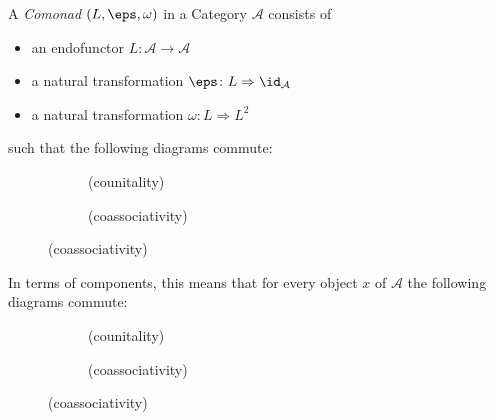 \begin{definition}[Comonad]
A \textit{Comonad} $(L,\eps, \omega) $ in a Category $\mathcal{A}$ consists of
\begin{itemize}
    \item an endofunctor $L\colon \mathcal{A} \to \mathcal{A}$
    \item a natural transformation $\eps \colon L \Rightarrow \id_{\mathcal{A}}$ 
    \item a natural transformation $\omega\colon L \Rightarrow L^2 $
\end{itemize}  
such that the following diagrams commute:

\begin{figure}[H]
\centering
\begin{subfigure}{0.4\textwidth}
\centering
\caption*{(counitality)}
\end{subfigure}
\hspace{2em}
\begin{subfigure}{0.4\textwidth}
\centering
\caption*{(coassociativity)}
\end{subfigure}
\end{figure}


In terms of components, this means that for every object $x$ of $\mathcal{A}$
the following diagrams commute:

\begin{figure}[H]
\centering
\begin{subfigure}{0.4\textwidth}
\centering
\caption*{(counitality)}
\end{subfigure}
\hspace{2em}
\begin{subfigure}{0.4\textwidth}
\centering
\caption*{(coassociativity)}
\end{subfigure}
\end{figure}


\end{definition}
